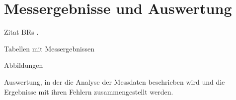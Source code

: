 \section{Messergebnisse und Auswertung}

Zitat BRs \cite{pdg}.

Tabellen mit Messergebnissen

Abbildungen

Auswertung, in der die Analyse der Messdaten beschrieben wird und die Ergebnisse mit ihren Fehlern zusammengestellt werden.